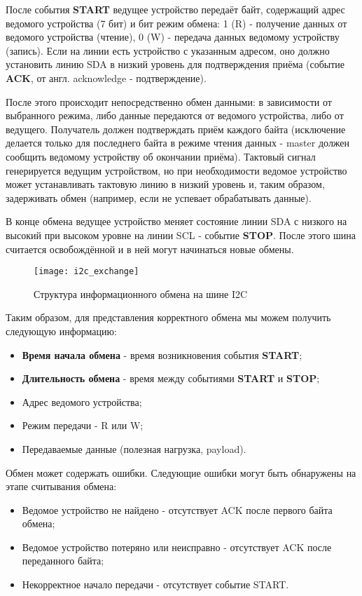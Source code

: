 После события \textbf{START} ведущее устройство передаёт байт, содержащий адрес ведомого устройства (7 бит) и бит режим обмена: 1 (R) - получение данных от ведомого устройства (чтение), 0 (W) - передача данных ведомому устройству (запись). Если на линии есть устройство с указанным адресом, оно должно установить линию SDA в низкий уровень для подтверждения приёма (событие \textbf{ACK}, от англ. acknowledge - подтверждение).

После этого происходит непосредственно обмен данными: в зависимости от выбранного режима, либо данные передаются от ведомого устройства, либо от ведущего. Получатель должен подтверждать приём каждого байта (исключение делается только для последнего байта в режиме чтения данных - master должен сообщить ведомому устройству об окончании приёма). Тактовый сигнал генерируется ведущим устройством, но при необходимости ведомое устройство может устанавливать тактовую линию в низкий уровень и, таким образом, задерживать обмен (например, если не успевает обрабатывать данные).

В конце обмена ведущее устройство меняет состояние линии SDA с низкого на высокий при высоком уровне на линии SCL - событие \textbf{STOP}. После этого шина считается освобождённой и в ней могут начинаться новые обмены.

\begin{figure}[H]
 \centering
 \texttt{[image: i2c\_exchange]}
 \caption{Структура информационного обмена на шине I2C}
 \label{fig:i2c_exchange}
\end{figure}

Таким образом, для представления корректного обмена мы можем получить следующую информацию:

\begin{itemize}
 \item \textbf{Время начала обмена} - время возникновения события \textbf{START};
 \item \textbf{Длительность обмена} - время между событиями \textbf{START} и \textbf{STOP};
 \item Адрес ведомого устройства;
 \item Режим передачи - R или W;
 \item Передаваемые данные (полезная нагрузка, payload).
\end{itemize}

Обмен может содержать ошибки. Следующие ошибки могут быть обнаружены на этапе считывания обмена:

\begin{itemize}
 \item Ведомое устройство не найдено - отсутствует ACK после первого байта обмена;
 \item Ведомое устройство потеряно или неисправно - отсутствует ACK после переданного байта;
 \item Некорректное начало передачи - отсутствует событие START.
\end{itemize}

